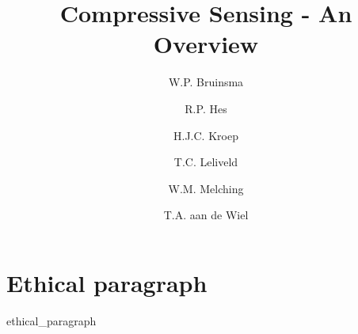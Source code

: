 \documentclass[a4paper, openany, oneside]{memoir}
\title{Compressive Sensing - An Overview}
\author{W.P. Bruinsma \and R.P. Hes \and H.J.C. Kroep \and T.C. Leliveld \and W.M. Melching \and T.A. aan de Wiel}
\begin{document}
\chapter{Ethical paragraph}
\label{ap:ethical}
{ethical_paragraph}
\end{document}
